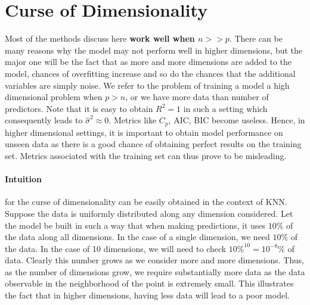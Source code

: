 \documentclass[../statistical_learning_notes.tex]{subfiles}
\begin{document}
    \section{Curse of Dimensionality}
    Most of the methods discuss here \textbf{work well when $n >> p$}. There can be many reasons why the model may not perform well in higher dimensions, but the major one will be the fact that as more and more dimensions are added to the model, chances of overfitting increase and so do the chances that the additional variables are simply noise.\newline
    We refer to the problem of training a model a high dimensional problem when $p > n$, or we have more data than number of predictors. Note that it is easy to obtain $R^{2} = 1$ in such a setting which consequently leads to $\hat{\sigma}^{2} \approx 0$. Metrics like $C_{p}$, AIC, BIC become useless.\newline
    Hence, in higher dimensional settings, it is important to obtain model performance on unseen data as there is a good chance of obtaining perfect results on the training set. Metrics associated with the training set can thus prove to be misleading.

    \paragraph{Intuition}
    for the curse of dimensionality can be easily obtained in the context of KNN.\newline
    Suppose the data is uniformly distributed along any dimension considered. Let the model be built in such a way that when making predictions, it uses $10\%$ of the data along all dimensions. \newline
    In the case of a single dimension, we need $10\%$ of the data. In the case of 10 dimensions, we will need to check $10\% ^{10} = 10^{-8}\%$ of data. Clearly this number grows as we consider more and more dimensions.\newline
    Thus, as the number of dimensions grow, we require substantially more data as the data observable in the neighborhood of the point is extremely small. This illustrates the fact that in higher dimensions, having less data will lead to a poor model.


    
\end{document}
